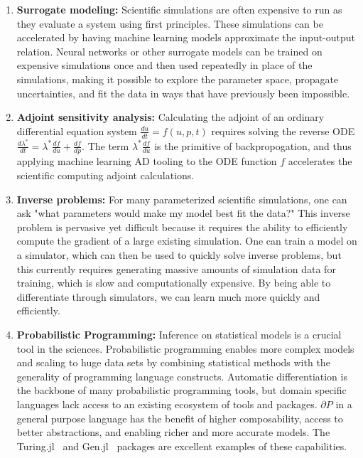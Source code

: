 \documentclass{juliacon}
\begin{document}
    \begin{enumerate}
    \item{\bf Surrogate modeling:}  Scientific simulations are often expensive to run as they evaluate a system using first principles. These simulations can be accelerated by having machine learning models approximate the input-output relation. Neural networks or other surrogate models can be trained on expensive simulations once and then used repeatedly in place of the simulations, making it possible to explore the parameter space, propagate uncertainties, and fit the data in ways that have previously been impossible.

    \item{\bf Adjoint sensitivity analysis:} Calculating the adjoint of an ordinary differential equation system $\frac{du}{dt} = f(u,p,t)$ requires solving the reverse ODE $\frac{d\lambda^{*}}{dt} = \lambda^{*} \frac{df}{du} + \frac{df}{dp}$. The term $\lambda^{*} \frac{df}{du}$ is the primitive of backpropogation, and thus applying machine learning AD tooling to the ODE function $f$ accelerates the scientific computing adjoint calculations.
    
    \item{\bf Inverse problems:}  For many parameterized scientific simulations, one can ask "what parameters would make my model best fit the data?" This inverse problem is pervasive yet difficult because it requires the ability to efficiently compute the gradient of a large existing simulation. One can train a model on a simulator, which can then be used to quickly solve inverse problems, but this currently requires generating massive amounts of simulation data for training, which is slow and computationally expensive. By being able to differentiate through simulators, we can learn much more quickly and efficiently.

    \item{\bf Probabilistic Programming:} Inference on statistical models is a crucial tool in the sciences. Probabilistic programming  
    enables more complex models and scaling to huge data sets by combining statistical methods with the generality of programming language constructs. Automatic differentiation is the backbone of many probabilistic programming tools, but domain specific languages lack access to an existing ecosystem of tools and packages. $\partial P$ in a general purpose language has the benefit of higher composability, access to better abstractions, and enabling richer and more accurate models. The Turing.jl~\cite{Turing.jl-2018} and Gen.jl~\cite{Gen.jl-2019} packages are excellent examples of these capabilities.

\end{enumerate}
\end{document}
